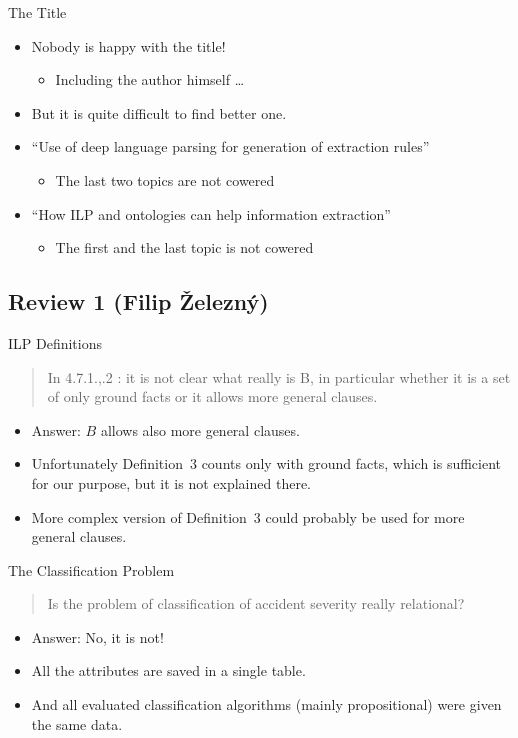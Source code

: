 \documentclass[xcolor=dvipsnames]{beamer}
\begin{document}
\begin{frame}{The Title}
\begin{itemize}
	\item Nobody is happy with the title!
	\begin{itemize}
		\item Including the author himself \dots
	\end{itemize}
	\bigskip
	\item But it is quite difficult to find better one.
	\bigskip
	\item ``Use of deep language parsing for generation of extraction rules''
	\begin{itemize}
		\item The last two topics are not cowered
	\end{itemize}
	\item ``How ILP and ontologies can help information extraction''
	\begin{itemize}
		\item The first and the last topic is not cowered
	\end{itemize}
\end{itemize}
\end{frame}



\subsection{Review 1 (Filip Železný)} 

\begin{frame}{ILP Definitions}
\begin{quotation}
In 4.7.1.,.2 : it is not clear what really is B, in particular whether it is a set of only ground facts or it
allows more general clauses.	
\end{quotation}
\begin{itemize}
	\item Answer: $B$ allows also more general clauses.
	\medskip
	\item Unfortunately Definition~3 counts only with ground facts, which is sufficient for our purpose, but it is not explained there.
	\bigskip
	\item More complex version of Definition~3 could probably be used for more general clauses.
\end{itemize}
\end{frame}

\begin{frame}{The Classification Problem}
\begin{quotation}
Is the problem of classification of accident severity really relational?
\end{quotation}
\begin{itemize}
	\item Answer: No, it is not!
	\medskip
	\item All the attributes are saved in a single table.
	\item And all evaluated classification algorithms (mainly propositional) were given the same data. 
\end{itemize}
\end{frame}
\end{document}
